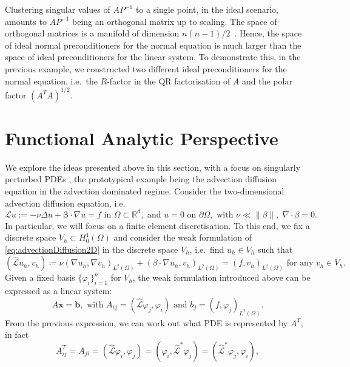 \documentclass[hidelinks,onefignum,onetabnum]{siamart220329}
\newcommand{\bb}[1]{#1}
\let\vec\mathbf
\newcommand{\norm}[1]{\left\lVert#1\right\rVert}
\begin{document}
Clustering singular values of $AP^{-1}$ to a single point, in the ideal scenario, amounts to $AP^{-1}$ being an orthogonal matrix up to scaling.
The space of orthogonal matrices is a manifold of dimension $n(n-1)/2$~\cite{edel98, epperly2025}. Hence, the space of ideal normal preconditioners for the normal equation is much larger than the space of ideal preconditioners for the linear system.
To demonstrate this, in the previous example, we constructed two different ideal preconditioners for the normal equation, i.e.~the $R$-factor in the QR factorisation of $A$ and the polar factor $(A^TA)^{1/2}$.

\section{Functional Analytic Perspective}
\label{sec:funcanal}
We explore the ideas presented above in this section, with a focus on singularly perturbed PDEs {\cite{Verhulst}}, the prototypical example being the advection diffusion equation in the advection dominated regime.
Consider the two-dimensional advection diffusion equation, i.e.~
\begin{equation}
    \label{eq:advectionDiffusion2D}
    \mathcal{L}u := -\nu \Delta u + \vec{\beta}\cdot \nabla u = f \text{ in }\Omega\subset\mathbb{R}^d, \text{ and } u = \bb{0} \text{ on }\partial\Omega, \text{ with } \nu\ll \norm{\beta},\;\nabla\cdot \beta =0.
\end{equation}
In particular, we will focus on a finite element discretisation.
To this end, we fix a discrete space $V_h\subset H^1_0(\Omega)$ and consider the weak formulation of \eqref{eq:advectionDiffusion2D} in the discrete space $V_h$, i.e.~find $u_h\in V_h$ such that
\begin{equation}
    \label{eq:weakForm}
    (\hat{\mathcal{L}}u_h,v_h)\coloneqq\nu (\nabla u_h, \nabla v_h)_{L^2(\Omega)} + (\beta\cdot \nabla u_h,v_h)_{L^2(\Omega)} = (f,v_h)_{L^2(\Omega)}\text{ for any } v_h\in V_h.
\end{equation}
Given a fixed basis $\{\varphi_i\}_{i=1}^{n}$ for $V_h$, the weak formulation introduced above can be expressed as a linear system:
\begin{equation}
    A\vec{x}=\vec{b}, \text{ with } A_{ij}=(\hat{\mathcal{L}}\varphi_j,\varphi_i)\text{ and } b_j = (f,\varphi_j)_{L^2(\Omega)}.
\end{equation}
From the previous expression, we can work out what PDE is represented by $A^T$, in fact
\begin{equation}
    A^T_{ij} = A_{ji} = (\hat{\mathcal{L}}\varphi_i,\varphi_j) = (\varphi_i, \hat{\mathcal{L}}^*\varphi_j) = (\hat{\mathcal{L}}^*\varphi_j,\varphi_i),
\end{equation}
\end{document}
